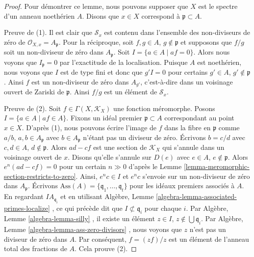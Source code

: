 \begin{proof}
Pour démontrer ce lemme, nous pouvons supposer que  $X$  est le spectre
d'un anneau noethérien  $A$. Disons que  $x \in X$  correspond à
 $\mathfrak p \subset A$.

\medskip\noindent
Preuve de (1). Il est clair que  $\mathcal{S}_x$  est contenu dans l'ensemble des
non-diviseurs de zéro de  $\mathcal{O}_{X, x} = A_\mathfrak p$. Pour la réciproque, soit  $f, g \in A$,
 $g \not \in \mathfrak p$  et supposons que  $f/g$  soit un non-diviseur de zéro dans
 $A_{\mathfrak p}$. Soit  $I = \{a \in A \mid af = 0\}$. Alors nous voyons que  $I_{\mathfrak p} = 0$  par
l'exactitude de la localisation. Puisque  $A$  est noethérien, nous voyons
que  $I$  est de type fini et donc que  $g'I = 0$  pour certains
 $g' \in A$,  $g' \not \in \mathfrak p$. Ainsi  $f$  est un non-diviseur de zéro dans
 $A_{g'}$, c'est-à-dire dans un voisinage ouvert de Zariski de  $\mathfrak p$.
Ainsi  $f/g$  est un élément de  $\mathcal{S}_x$.

\medskip\noindent
Preuve de (2). Soit  $f \in \Gamma(X, \mathcal{K}_X)$  une fonction méromorphe. Posons  $I = \{a \in A \mid af \in A\}$.
Fixons un idéal premier  $\mathfrak p \subset A$  correspondant au point  $x \in X$. D'après (1),
nous pouvons écrire l'image de  $f$  dans la fibre en  $\mathfrak p$  comme
 $a/b$,  $a, b \in A_{\mathfrak p}$  avec  $b \in A_{\mathfrak p}$  n'étant pas un diviseur de zéro.
Écrivons  $b = c/d$  avec  $c, d \in A$,  $d \not \in \mathfrak p$. Alors  $ad - cf$  est une
section de  $\mathcal{K}_X$  qui s'annule dans un voisinage ouvert de  $x$.
Disons qu'elle s'annule sur  $D(e)$  avec  $e \in A$,  $e \not \in \mathfrak p$. Alors
 $e^n(ad - cf) = 0$  pour un certain  $n \gg 0$  d'après le Lemme  \ref{lemma-meromorphic-section-restricts-to-zero}. Ainsi,
 $e^nc \in I$  et  $e^nc$  s'envoie sur un non-diviseur de zéro dans
 $A_{\mathfrak p}$. Écrivons  $\text{Ass}(A) = \{\mathfrak q_1, \ldots, \mathfrak q_t\}$  pour les idéaux premiers associés à  $A$. En
regardant  $IA_{\mathfrak q_i}$  et en utilisant Algèbre, Lemme  \ref{algebra-lemma-associated-primes-localize} , ce qui précède
dit que  $I \not \subset \mathfrak q_i$  pour chaque  $i$. Par Algèbre, Lemme  \ref{algebra-lemma-silly} , il
existe un élément  $z \in I$,  $z \not \in \bigcup \mathfrak q_i$. Par Algèbre, Lemme  \ref{algebra-lemma-ass-zero-divisors} ,
nous voyons que  $z$  n'est pas un diviseur de zéro dans  $A$. Par
conséquent,  $f = (zf)/z$  est un élément de l'anneau total des fractions de
 $A$. Cela prouve (2).
\end{proof}

